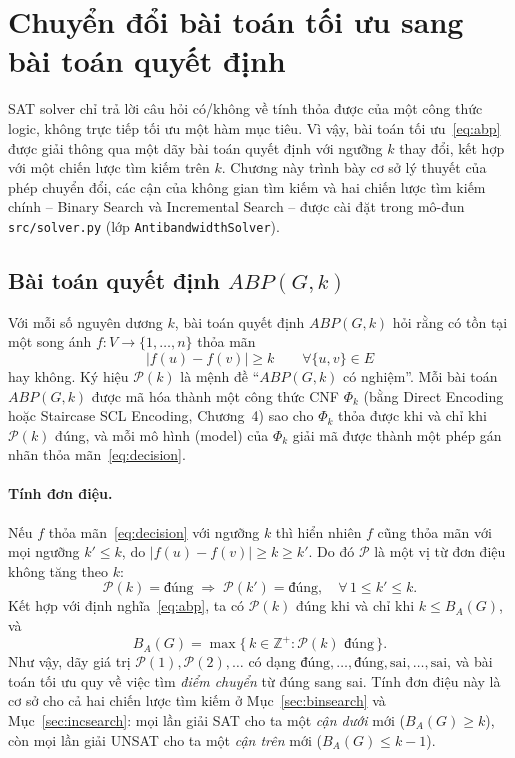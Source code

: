\documentclass[a4paper,fleqn]{cas-sc}
\begin{document}
\section{Chuyển đổi bài toán tối ưu sang bài toán quyết định}
\label{sec:opt2dec}
SAT solver chỉ trả lời câu hỏi có/không về tính thỏa được của một công thức logic, không trực tiếp tối ưu một hàm mục tiêu. Vì vậy, bài toán tối ưu~\eqref{eq:abp} được giải thông qua một dãy bài toán quyết định với ngưỡng $k$ thay đổi, kết hợp với một chiến lược tìm kiếm trên $k$. Chương này trình bày cơ sở lý thuyết của phép chuyển đổi, các cận của không gian tìm kiếm và hai chiến lược tìm kiếm chính -- Binary Search và Incremental Search -- được cài đặt trong mô-đun \texttt{src/solver.py} (lớp \texttt{AntibandwidthSolver}).

\subsection{Bài toán quyết định $ABP(G,k)$}
\label{sec:decision}
Với mỗi số nguyên dương $k$, bài toán quyết định $ABP(G, k)$ hỏi rằng có tồn tại một song ánh $f : V \to \{1, \dots, n\}$ thỏa mãn
\begin{equation}
\label{eq:decision}
|f(u) - f(v)| \ge k \qquad \forall \{u, v\} \in E
\end{equation}
hay không. Ký hiệu $\mathcal{P}(k)$ là mệnh đề ``$ABP(G, k)$ có nghiệm''. Mỗi bài toán $ABP(G, k)$ được mã hóa thành một công thức CNF $\Phi_k$ (bằng Direct Encoding hoặc Staircase SCL Encoding, Chương~4) sao cho $\Phi_k$ thỏa được khi và chỉ khi $\mathcal{P}(k)$ đúng, và mỗi mô hình (model) của $\Phi_k$ giải mã được thành một phép gán nhãn thỏa mãn~\eqref{eq:decision}.

\paragraph{Tính đơn điệu.} Nếu $f$ thỏa mãn~\eqref{eq:decision} với ngưỡng $k$ thì hiển nhiên $f$ cũng thỏa mãn với mọi ngưỡng $k' \le k$, do $|f(u) - f(v)| \ge k \ge k'$. Do đó $\mathcal{P}$ là một vị từ đơn điệu không tăng theo $k$:
\begin{equation}
\mathcal{P}(k) = \text{đúng} \;\Longrightarrow\; \mathcal{P}(k') = \text{đúng}, \quad \forall\, 1 \le k' \le k.
\end{equation}
Kết hợp với định nghĩa~\eqref{eq:abp}, ta có $\mathcal{P}(k)$ đúng khi và chỉ khi $k \le B_A(G)$, và
\begin{equation}
B_A(G) = \max \{\, k \in \mathbb{Z}^{+} : \mathcal{P}(k) \text{ đúng} \,\}.
\end{equation}
Như vậy, dãy giá trị $\mathcal{P}(1), \mathcal{P}(2), \dots$ có dạng $\text{đúng}, \dots, \text{đúng}, \text{sai}, \dots, \text{sai}$, và bài toán tối ưu quy về việc tìm \emph{điểm chuyển} từ đúng sang sai. Tính đơn điệu này là cơ sở cho cả hai chiến lược tìm kiếm ở Mục~\ref{sec:binsearch} và Mục~\ref{sec:incsearch}: mọi lần giải SAT cho ta một \emph{cận dưới} mới ($B_A(G) \ge k$), còn mọi lần giải UNSAT cho ta một \emph{cận trên} mới ($B_A(G) \le k - 1$).
\end{document}
